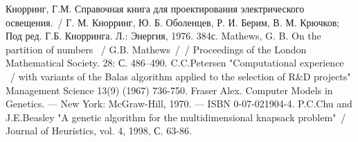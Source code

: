 \begin{thebibliography}{100}
Кнорринг, Г.М. Справочная книга для проектирования электрического освещения.~/
Г. М. Кнорринг, Ю. Б. Оболенцев, Р. И. Берим, В. М. Крючков; Под ред. Г.Б. Кнорринга. Л.: Энергия, 1976. 384с.
Mathews, G. B. On the partition of numbers ~/
G.B. Mathews~/~/
Proceedings of the London Mathematical Society. 28: С. 486–490. 
C.C.Petersen "Computational experience ~/
with variants of the Balas algorithm applied to the selection
of R\&D projects" Management Science 13(9) (1967) 736-750.
Fraser Alex. Computer Models in Genetics. — New York: McGraw-Hill, 1970. — ISBN 0-07-021904-4.
P.C.Chu and J.E.Beasley "A genetic algorithm for the multidimensional knapsack problem"~/
 Journal of Heuristics, vol. 4, 1998, С. 63-86.
\end{thebibliography}
